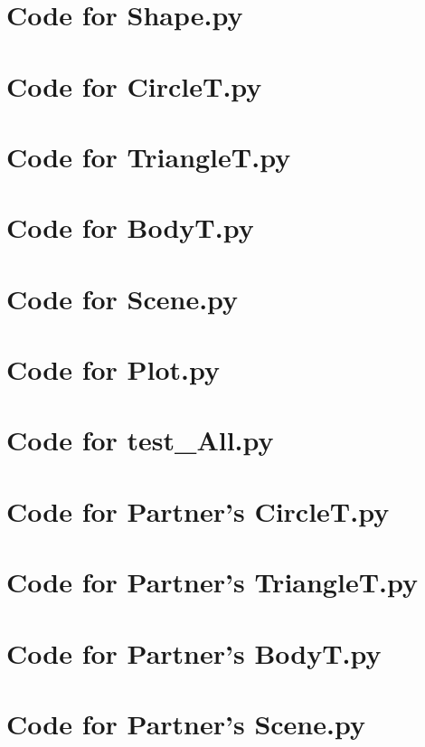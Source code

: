 \documentclass[12pt]{article}
\begin{document}
\section{Code for Shape.py}
\noindent 
\newpage
\section{Code for CircleT.py}
\noindent 
\newpage
\section{Code for TriangleT.py}
\noindent 
\newpage
\section{Code for BodyT.py}
\noindent 
\newpage
\section{Code for Scene.py}
\noindent 
\newpage
\section{Code for Plot.py}
\noindent 
\newpage
\section{Code for test\_All.py}
\noindent 
\newpage
\section{Code for Partner's CircleT.py}
\noindent 
\newpage
\section{Code for Partner's TriangleT.py}
\noindent 
\newpage
\section{Code for Partner's BodyT.py}
\noindent 
\newpage
\section{Code for Partner's Scene.py}
\noindent 
\newpage
\end{document}
